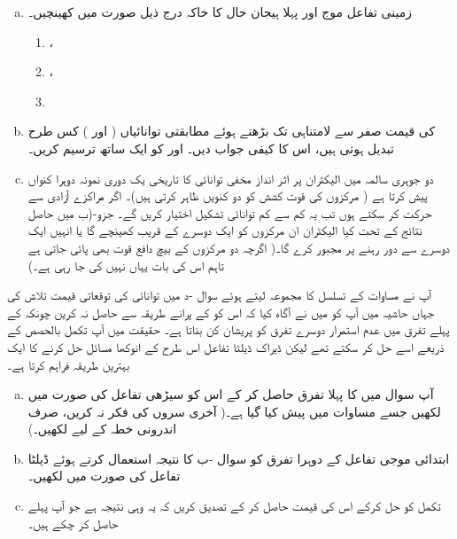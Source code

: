 \begin{enumerate}[a.]
\item
زمینی تفاعل موج  اور پہلا ہیجان حال  کا خاکہ درج ذیل صورت میں کھینچیں۔
\begin{multicols}{3}
\begin{enumerate}[1.]
\item
 ،
 \item
 ،
\item 
 \end{enumerate}
 \end{multicols}
\item
  کی قیمت صفر سے لامتناہی تک بڑھتے ہوئے مطابقتی توانائیاں ( اور ) کس طرح تبدیل ہوتی ہیں، اس کا کیفی جواب دیں۔  اور  کو ایک ساتھ ترسیم کریں۔
\item
 دو جوہری سالمہ میں الیکٹران پر اثر انداز مخفی توانائی کا تاریخی یک دوری نمونہ دوہرا کنواں پیش کرتا ہے ( مرکزوں کی قوت کشش کو دو کنویں ظاہر کرتی ہیں)۔ اگر مراکزے آزادی سے حرکت کر سکتے ہوں تب یہ کم سے کم توانائی تشکیل  اختیار کریں گے۔ جزو-(ب میں حاصل نتائج کے تحت کیا الیکٹران ان مرکزوں کو ایک دوسرے کے قریب کھینچے گا یا انہیں ایک دوسرے سے دور رہنے پر مجبور کرے گا۔( اگرچہ دو مرکزوں کے بیچ دافع قوت  بھی پائی جاتی  ہے تاہم اس کی بات یہاں نہیں کی جا رہی ہے۔)
\end{enumerate}
آپ نے مساوات  کے تسلسل کا مجموعہ لیتے ہوئے سوال -د میں توانائی کی توقعاتی قیمت تلاش کی جہاں حاشیہ میں آپ کو میں نے آگاہ کیا کہ اس کو  کے  پرانے طریقہ سے حاصل نہ کریں چونکہ  کے پہلے تفرق میں عدم استمرار دوسرے تفرق کو پریشان کن بناتا ہے۔ حقیقت میں آپ تکمل بالحصص کے ذریعے اسے حل کر سکتے تھے لیکن ڈیراک ڈیلٹا تفاعل اس طرح کے انوکھا مسائل حل کرنے کا ایک بہترین طریقہ فراہم کرتا ہے۔
\begin{enumerate}[a.]
\item
 آپ سوال  میں  کا پہلا تفرق حاصل کر کے اس کو سیڑھی تفاعل  کی صورت میں لکھیں جسے مساوات  میں پیش کیا گیا ہے۔( آخری سروں کی فکر نہ کریں، صرف اندرونی خطہ  کے لیے لکھیں۔)
\item
 ابتدائی موجی تفاعل  کے دوہرا تفرق کو سوال -ب کا نتیجہ استعمال کرتے ہوئے ڈیلٹا تفاعل کی صورت میں لکھیں۔
\item
 تکمل  کو حل کرکے اس کی قیمت حاصل کر کے تصدیق کریں کہ یہ وہی نتیجہ ہے جو آپ پہلے حاصل کر چکے ہیں۔
\end{enumerate}
